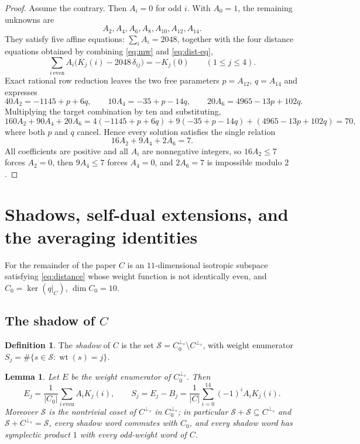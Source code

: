 \documentclass[11pt]{amsart}
\newtheorem{lemma}[theorem]{Lemma}
\theoremstyle{definition}
\newtheorem{definition}[theorem]{Definition}
\theoremstyle{remark}
\DeclareMathOperator{\wt}{wt}
\newcommand{\perps}{{\perp_s}}
\begin{document}
\begin{proof}
Assume the contrary.  Then $A_i=0$ for odd $i$.  With $A_0=1$, the remaining
unknowns are
\[
A_2,A_4,A_6,A_8,A_{10},A_{12},A_{14}.
\]
They satisfy five affine equations: $\sum_i A_i=2048$, together with the four
distance equations obtained by combining \eqref{eq:mw} and \eqref{eq:dist-eq},
\[
\sum_{i\ \mathrm{even}}A_i\bigl(K_j(i)-2048\,\delta_{ij}\bigr)=-K_j(0)
\qquad (1\le j\le 4).
\]
Exact rational row reduction leaves the two free parameters $p=A_{12}$,
$q=A_{14}$ and expresses
\[
40A_2=-1145+p+6q,\qquad
10A_4=-35+p-14q,\qquad
20A_6=4965-13p+102q .
\]
Multiplying the target combination by ten and substituting,
\[
160A_2+90A_4+20A_6
=4(-1145+p+6q)+9(-35+p-14q)+(4965-13p+102q)=70 ,
\]
where both $p$ and $q$ cancel.  Hence every solution satisfies the single
relation
\begin{equation}\label{eq:even-relation}
16A_2+9A_4+2A_6=7 .
\end{equation}
All coefficients are positive and all $A_i$ are nonnegative integers, so
$16A_2\le 7$ forces $A_2=0$, then $9A_4\le7$ forces $A_4=0$, and
$2A_6=7$ is impossible modulo $2$.
\end{proof}

\section{Shadows, self-dual extensions, and the averaging identities}
\label{sec:shadow}

For the remainder of the paper $C$ is an $11$-dimensional isotropic
subspace satisfying \eqref{eq:distance} whose weight function is not
identically even, and $C_0=\ker(q|_C)$, $\dim C_0=10$.

\subsection{\texorpdfstring{The shadow of $C$}{The shadow of C}}

\begin{definition}
The \emph{shadow} of $C$ is the set
$\mathcal S=C_0^{\perps}\setminus C^{\perps}$, with weight enumerator
$S_j=\#\{s\in\mathcal S:\wt(s)=j\}$.
\end{definition}

\begin{lemma}\label{lem:shadow}
Let $E$ be the weight enumerator of $C_0^{\perps}$.  Then
\begin{equation}\label{eq:eshadow}
E_j=\frac{1}{|C_0|}\sum_{i\ \mathrm{even}}A_iK_j(i),
\qquad
S_j=E_j-B_j=\frac{1}{|C|}\sum_{i=0}^{14}(-1)^iA_iK_j(i) .
\end{equation}
Moreover $\mathcal S$ is the nontrivial coset of $C^{\perps}$ in
$C_0^{\perps}$; in particular
$\mathcal S+\mathcal S\subseteq C^{\perps}$ and
$\mathcal S+C^{\perps}=\mathcal S$, every shadow word commutes with
$C_0$, and every shadow word has symplectic product $1$ with every
odd-weight word of $C$.
\end{lemma}
\end{document}

